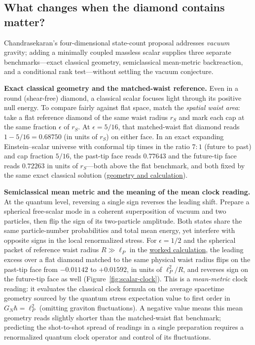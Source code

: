 \documentclass[10pt,a4paper]{article}
\newcommand{\repo}[2]{\href{https://github.com/sprajs/quantum-gravity/blob/main/#1}{#2}}
\begin{document}
\subsection{What changes when the diamond contains matter?}
Chandrasekaran's four-dimensional state-count proposal addresses \emph{vacuum} gravity; adding a minimally coupled massless scalar supplies three separate benchmarks---exact classical geometry, semiclassical mean-metric backreaction, and a conditional rank test---without settling the vacuum conjecture.

\textbf{Exact classical geometry and the matched-waist reference.} Even in a round (shear-free) diamond, a classical scalar focuses light through its positive null energy. To compare fairly against flat space, match the \emph{spatial waist area}: take a flat reference diamond of the same waist radius $r_S$ and mark each cap at the same fraction $\epsilon$ of $r_S$. At $\epsilon = 5/16$, that matched-waist flat diamond reads $1 - 5/16 = 0.68750$ (in units of $r_S$) on either face. In an exact expanding Einstein--scalar universe with conformal tip times in the ratio $7:1$ (future to past) and cap fraction $5/16$, the past-tip face reads $0.77643$ and the future-tip face reads $0.72263$ in units of $r_S$---both above the flat benchmark, and both fixed by the same exact classical solution (\repo{audit/matter-diamond.md}{geometry and calculation}).

\textbf{Semiclassical mean metric and the meaning of the mean clock reading.} At the quantum level, reversing a single sign reverses the leading shift. Prepare a spherical free-scalar mode in a coherent superposition of vacuum and two particles, then flip the sign of its two-particle amplitude. Both states share the same particle-number probabilities and total mean energy, yet interfere with opposite signs in the local renormalized stress. For $\epsilon = 1/2$ and the spherical packet of reference waist radius $R \gg \ell_P$ in the \repo{audit/matter-null-energy.md}{worked calculation}, the leading excess over a flat diamond matched to the same physical waist radius flips on the past-tip face from $-0.01142$ to $+0.01592$, in units of $\ell_P^2/R$, and reverses sign on the future-tip face as well (Figure~\ref{fig:scalar-clock}). This is a \emph{mean-metric} clock reading: it evaluates the classical clock formula on the average spacetime geometry sourced by the quantum stress expectation value to first order in $G_N\hbar = \ell_P^2$ (omitting graviton fluctuations). A negative value means this mean geometry reads slightly shorter than the matched-waist flat benchmark; predicting the shot-to-shot spread of readings in a single preparation requires a renormalized quantum clock operator and control of its fluctuations.
\end{document}
